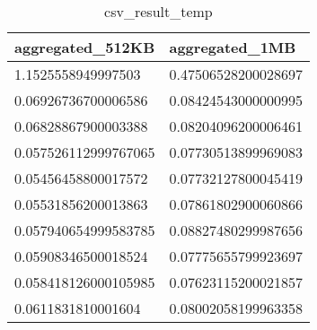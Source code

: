 ﻿\begin{table}[!ht]
    \centering
    \caption{csv_result_temp}
    \begin{tabular}{|l|l|}
    \hline
        aggregated\_512KB & aggregated\_1MB \\ \hline
        1.1525558949997503 & 0.47506528200028697 \\ \hline
        0.06926736700006586 & 0.08424543000000995 \\ \hline
        0.06828867900003388 & 0.08204096200006461 \\ \hline
        0.057526112999767065 & 0.07730513899969083 \\ \hline
        0.05456458800017572 & 0.07732127800045419 \\ \hline
        0.05531856200013863 & 0.07861802900060866 \\ \hline
        0.057940654999583785 & 0.08827480299987656 \\ \hline
        0.05908346500018524 & 0.07775655799923697 \\ \hline
        0.058418126000105985 & 0.07623115200021857 \\ \hline
        0.0611831810001604 & 0.08002058199963358 \\ \hline
    \end{tabular}
    \label{csv_result_temp}
\end{table}